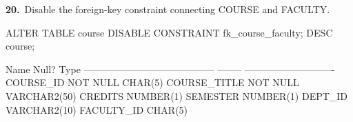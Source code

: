 
\noindent\begin{minipage}{\linewidth}
\begingroup{}
{\fontsize{14}{17}\selectfont\textbf{20.}}\ Disable the foreign-key constraint connecting COURSE and FACULTY.\par
\endgroup\vspace{12pt}


\begin{sqlcode}
ALTER TABLE course DISABLE CONSTRAINT fk_course_faculty;
DESC course;
\end{sqlcode}

\vspace{18pt}


\begin{sqlout}
 Name                                      Null?    Type
 ----------------------------------------- -------- ----------------------------
 COURSE_ID                                 NOT NULL CHAR(5)
 COURSE_TITLE                              NOT NULL VARCHAR2(50)
 CREDITS                                            NUMBER(1)
 SEMESTER                                           NUMBER(1)
 DEPT_ID                                            VARCHAR2(10)
 FACULTY_ID                                         CHAR(5)
\end{sqlout}
\end{minipage}\par\vspace{30pt}

